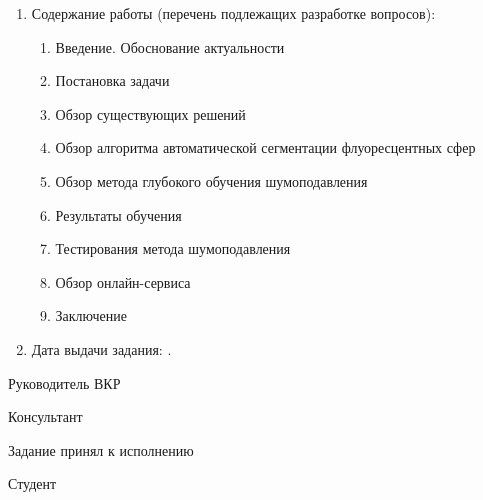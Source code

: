 \begin{enumerate}[1.]
	\item Содержание работы (перечень подлежащих разработке вопросов):
	\begin{enumerate}[label=\theenumi\arabic*.]
		\item Введение. Обоснование актуальности
		\item Постановка задачи
		\item Обзор существующих решений
		\item Обзор алгоритма автоматической сегментации флуоресцентных сфер
		\item Обзор метода глубокого обучения шумоподавления
		\item Результаты обучения
		\item Тестирования метода шумоподавления
		\item Обзор онлайн-сервиса
		\item Заключение
	\end{enumerate}
		\item Дата выдачи задания: \thesisStartDate.
\end{enumerate}

\intervalS%

Руководитель ВКР \uline{\hspace*{0.1\textheight}}\Supervisor


\intervalS%

Консультант \uline{\hspace*{0.1\textheight}}\ConsultantExtra


\intervalS%


Задание принял к исполнению \thesisStartDate

\intervalS%

Студент \uline{\hspace*{0.1\textheight}}\Author



